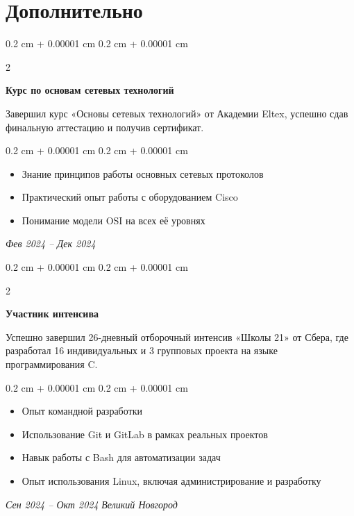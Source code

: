 \documentclass[10pt, letterpaper]{article}
\newenvironment{highlights}{
    \begin{itemize}[
        topsep=0.20 cm,
        parsep=0.20 cm,
        partopsep=0pt,
        itemsep=0pt,
        leftmargin=0.4 cm + 10pt
    ]
}{
    \end{itemize}
} %
\newenvironment{onecolentry}{
    \begin{adjustwidth}{
        0.2 cm + 0.00001 cm
    }{
        0.2 cm + 0.00001 cm
    }
}{
    \end{adjustwidth}
} %
\newenvironment{twocolentry}[2][]{
    \onecolentry
    \def\secondColumn{#2}
    \setcolumnwidth{\fill, 4.5 cm}
    \begin{paracol}{2}
}{
    \switchcolumn \raggedleft \secondColumn
    \end{paracol}
    \endonecolentry
} %
\begin{document}
    \vspace{0.3 cm - 0.3 cm}

    \section{Дополнительно}
    \begin{twocolentry}{
        \textit{Фев 2024 – Дек 2024}}
        
            \textbf{Курс по основам сетевых технологий}
                \item Завершил курс «Основы сетевых технологий» от Академии Eltex, успешно сдав финальную аттестацию и получив сертификат.

            \textit{}
        

        \begin{onecolentry}
            \begin{highlights}
                \item Знание принципов работы основных сетевых протоколов 
                \item Практический опыт работы с оборудованием Cisco
                \item Понимание модели OSI на всех её уровнях

            \end{highlights}
        \end{onecolentry}
        \end{twocolentry}

    \vspace{0.5 cm}
    
    \begin{twocolentry}{
        \textit{Сен 2024 – Окт 2024}
        \textit{Великий Новгород}}
        
            \textbf{Участник интенсива}
                \item Успешно завершил 26-дневный отборочный интенсив «Школы 21» от Сбера, где разработал 16 индивидуальных и 3 групповых проекта на языке программирования C.

            \textit{}

        \begin{onecolentry}
            \begin{highlights}
                \item Опыт командной разработки
                \item Использование Git и GitLab в рамках реальных проектов
                \item Навык работы с Bash для автоматизации задач
                \item Опыт использования Linux, включая администрирование и разработку

            \end{highlights}
        \end{onecolentry}
        \end{twocolentry}
\end{document}
